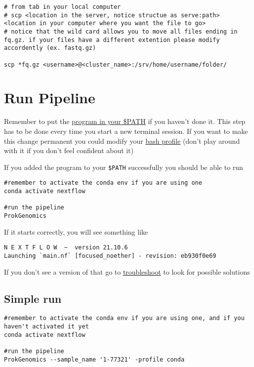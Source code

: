 \documentclass[
]{book}
\begin{document}
\begin{verbatim}
# from tab in your local computer
# scp <location in the server, notice structue as serve:path> <location in your computer where you want the file to go>
# notice that the wild card allows you to move all files ending in fq.gz. if your files have a different extention please modify accordently (ex. fastq.gz)

scp *fq.gz <username>@<cluster_name>:/srv/home/username/folder/
\end{verbatim}

\hypertarget{run-pipeline}{%
\chapter{Run Pipeline}\label{run-pipeline}}

Remember to put the \href{getting-started.}{program in your \$PATH} if you haven't done it. This step has to be done every time you start a new terminal session. If you want to make this change permanent you could modify your \href{https://stackoverflow.com/questions/14637979/how-to-permanently-set-path-on-linux-unix}{bash profile} (don't play around with it if you don't feel confident about it)

If you added the program to your \texttt{\$PATH} successfully you should be able to run

\begin{verbatim}
#remember to activate the conda env if you are using one
conda activate nextflow

#run the pipeline
ProkGenomics
\end{verbatim}

If it starts correctly, you will see something like

\begin{verbatim}
N E X T F L O W  ~  version 21.10.6
Launching `main.nf` [focused_noether] - revision: eb930f0e69
\end{verbatim}

If you don't see a version of that go to \href{troubleshooting.html}{troubleshoot} to look for possible solutions

\hypertarget{simple-run}{%
\section{Simple run}\label{simple-run}}

\begin{verbatim}
#remember to activate the conda env if you are using one, and if you haven't activated it yet
conda activate nextflow

#run the pipeline
ProkGenomics --sample_name '1-77321' -profile conda
\end{verbatim}
\end{document}
